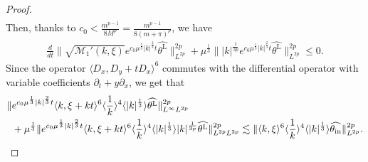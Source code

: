 \documentclass[reqno, 12pt]{amsart} %
\theoremstyle{plain} %
\theoremstyle{definition}
\theoremstyle{remark}
\numberwithin{equation}{section} %
\begin{document}
\begin{proof}
\begin{align*}
		\end{align*}
		Then, thanks to $c_0 < \frac{m^{p-1}}{8M^p} = \frac{m^{p-1}}{8(m+\pi)^p}$, we have 
		\begin{align} \label{eq:est of theta L}
			\frac{d}{dt} \| \sqrt{\mathcal{M}_1'(k, \xi)}   e^{c_0 \mu^\frac13 |k|^\frac23 t} \widehat{\theta^{\mathrm{L}} } \|_{L^{2p}}^{2p}  +  \mu^\frac13 \| |k|^\frac{1}{3p} e^{c_0 \mu^\frac13 |k|^\frac23 t} \widehat{\theta^{\mathrm{L}} }\|_{L^{2p}}^{2p} \leq 0.
		\end{align}
		Since the operator $\langle D_x, D_y + tD_x\rangle^6$ commutes with the differential operator with variable coefficients $\partial_t+y \partial_x$, we get that
		\begin{equation}\begin{aligned} \label{eq:est of linear theta L2}
				\|  &e^{c_0 \mu^\frac13 |k|^\frac23 t} \langle k, \xi + kt\rangle^6 \langle \frac{1}{k}\rangle^4 \langle |k|^\frac13 \rangle \widehat{\theta^{\mathrm{L}}} \|_{L^\infty L^{2p}}^{2p} \\
				&+ \mu^\frac13 \| e^{ c_0 \mu^\frac13 |k|^\frac23 t}    \langle k, \xi + kt\rangle^6 \langle \frac{1}{k}\rangle^4 \langle |k|^\frac13 \rangle |k|^\frac{1}{3p} \widehat{\theta^{\mathrm{L}}} \|_{L^{2p} L^{2p}}^{2p} \lesssim \|  \langle k, \xi\rangle^6 \langle \frac{1}{k}\rangle^4 \langle |k|^\frac13 \rangle \widehat{\theta_{\rm in}} \|_{L^{2p}}^{2p} . 
		\end{aligned}\end{equation}

\end{proof}
\end{document}
